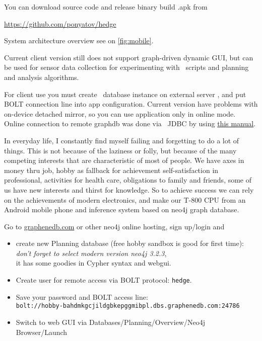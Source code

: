 \secdown


You can download source code and release binary build .apk from

\bigskip
\url{https://github.com/ponyatov/hedge}
\bigskip

System architecture overview see on \autoref{fig:mobile}.
\bigskip

Current client version still does not support graph-driven dynamic GUI, but can
be used for sensor data collection for experimenting with \neo\ scripts and
planning and analysis algorithms.

For client use you must create \neo\ database instance on external server
, and put BOLT connection line into app configuration. Current version
have problems with on-device detached mirror,
so you can use application only in online mode. Online connection to remote
graphdb was done via \neo\ JDBC by using
\href{https://github.com/neo4j-contrib/neo4j-jdbc#minimum-viable-snippet}{this
manual}.


In everyday life, I constantly find myself failing and forgetting to do a lot of
things. This is not because of the laziness or folly, but because of the many
competing interests that are characteristic of most of people. We have axes in
money thru job, hobby as fallback for achievement self-satisfaction in
professional, activities for health care, obligations to family and friends,
some of us have new interests and thirst for knowledge. So to achieve success we
can rely on the achievements of modern electronics, and make our T-800 CPU from
an Android mobile phone and inference system based on neo4j graph database.

\bigskip
Go to \href{https://www.graphenedb.com/}{graphenedb.com} or other neo4j online
hosting, sign up/login and 
\begin{itemize}[nosep,leftmargin=*]
  \item 
create new Planning database (free hobby sandbox is good for first time):\\
\emph{don't forget to select modern version neo4j 3.2.3},\\
it has some goodies in Cypher syntax and webgui.
  \item 
Create user for remote access via BOLT protocol: \verb|hedge|.
  \item 
Save your password and BOLT access line:\\ 
\verb|bolt://hobby-bahdmkgcjildgbkepggmibpl.dbs.graphenedb.com:24786|
  \item 
Switch to web GUI via Databases/Planning/Overview/Neo4j Browser/Launch
\end{itemize}
\bigskip

